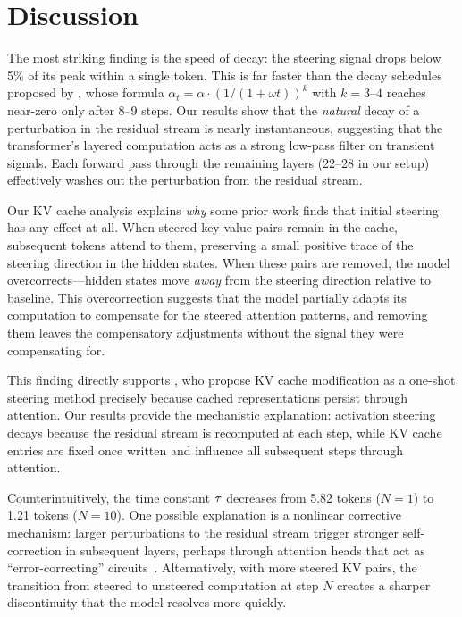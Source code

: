 \section{Discussion}
\label{sec:discussion}

The most striking finding is the speed of decay: the steering signal drops below 5\% of its peak within a single token. This is far faster than the decay schedules proposed by \citet{xie2025comparative}, whose formula $\alpha_t = \alpha \cdot (1/(1 + \omega t))^k$ with $k = 3$--$4$ reaches near-zero only after 8--9 steps. Our results show that the \emph{natural} decay of a perturbation in the residual stream is nearly instantaneous, suggesting that the transformer's layered computation acts as a strong low-pass filter on transient signals. Each forward pass through the remaining layers (22--28 in our setup) effectively washes out the perturbation from the residual stream.

Our KV cache analysis explains \emph{why} some prior work finds that initial steering has any effect at all. When steered key-value pairs remain in the cache, subsequent tokens attend to them, preserving a small positive trace of the steering direction in the hidden states. When these pairs are removed, the model overcorrects---hidden states move \emph{away} from the steering direction relative to baseline. This overcorrection suggests that the model partially adapts its computation to compensate for the steered attention patterns, and removing them leaves the compensatory adjustments without the signal they were compensating for.

This finding directly supports \citet{belitsky2025kv}, who propose KV cache modification as a one-shot steering method precisely because cached representations persist through attention. Our results provide the mechanistic explanation: activation steering decays because the residual stream is recomputed at each step, while KV cache entries are fixed once written and influence all subsequent steps through attention.

Counterintuitively, the time constant $\tau$ decreases from 5.82 tokens ($N = 1$) to 1.21 tokens ($N = 10$). One possible explanation is a nonlinear corrective mechanism: larger perturbations to the residual stream trigger stronger self-correction in subsequent layers, perhaps through attention heads that act as ``error-correcting'' circuits~\citep{arditi2024refusal}. Alternatively, with more steered KV pairs, the transition from steered to unsteered computation at step $N$ creates a sharper discontinuity that the model resolves more quickly.

